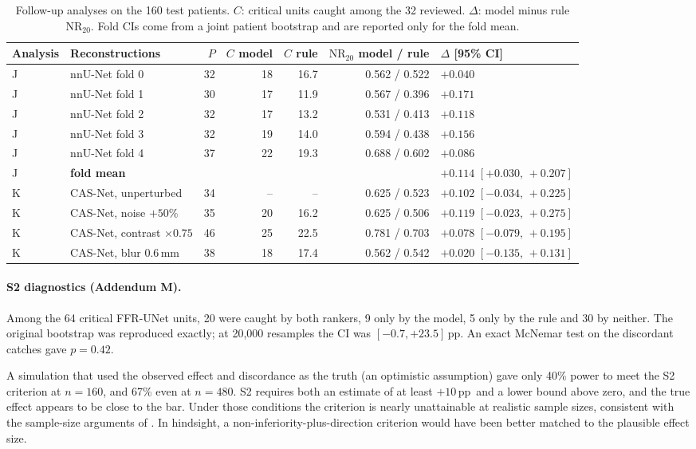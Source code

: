 \documentclass[11pt]{article}
\newcommand{\NR}{\mathrm{NR}_{20}}
\newcommand{\pp}{\,pp}
\begin{document}
\begin{table}[t]
\centering
\small
\caption{Follow-up analyses on the 160 test patients. $C$: critical units caught among the 32 reviewed. $\Delta$: model minus rule $\NR$. Fold CIs come from a joint patient bootstrap and are reported only for the fold mean.}
\label{tab:follow}
\setlength{\tabcolsep}{4pt}
\begin{tabular}{llrrrrl}
\toprule
Analysis & Reconstructions & $P$ & $C$ model & $C$ rule & $\NR$ model / rule & $\Delta$ [95\% CI] \\
\midrule
J & nnU-Net fold 0 & 32 & 18 & 16.7 & 0.562 / 0.522 & $+0.040$ \\
J & nnU-Net fold 1 & 30 & 17 & 11.9 & 0.567 / 0.396 & $+0.171$ \\
J & nnU-Net fold 2 & 32 & 17 & 13.2 & 0.531 / 0.413 & $+0.118$ \\
J & nnU-Net fold 3 & 32 & 19 & 14.0 & 0.594 / 0.438 & $+0.156$ \\
J & nnU-Net fold 4 & 37 & 22 & 19.3 & 0.688 / 0.602 & $+0.086$ \\
J & \textbf{fold mean} & & & & & $\mathbf{+0.114}$ $[+0.030,\,+0.207]$ \\
\midrule
K & CAS-Net, unperturbed & 34 & -- & -- & 0.625 / 0.523 & $+0.102$ $[-0.034,\,+0.225]$ \\
K & CAS-Net, noise $+50\%$ & 35 & 20 & 16.2 & 0.625 / 0.506 & $+0.119$ $[-0.023,\,+0.275]$ \\
K & CAS-Net, contrast $\times 0.75$ & 46 & 25 & 22.5 & 0.781 / 0.703 & $+0.078$ $[-0.079,\,+0.195]$ \\
K & CAS-Net, blur 0.6\,mm & 38 & 18 & 17.4 & 0.562 / 0.542 & $+0.020$ $[-0.135,\,+0.131]$ \\
\bottomrule
\end{tabular}
\end{table}

\paragraph{S2 diagnostics (Addendum M).} Among the 64 critical FFR-UNet units, 20 were caught by both rankers, 9 only by the model, 5 only by the rule and 30 by neither. The original bootstrap was reproduced exactly; at 20{,}000 resamples the CI was $[-0.7, +23.5]$\pp. An exact McNemar test \citep{mcnemar1947} on the discordant catches gave $p = 0.42$.

A simulation that used the observed effect and discordance as the truth (an optimistic assumption) gave only 40\% power to meet the S2 criterion at $n=160$, and 67\% even at $n = 480$. S2 requires both an estimate of at least $+10$\pp\ and a lower bound above zero, and the true effect appears to be close to the bar. Under those conditions the criterion is nearly unattainable at realistic sample sizes, consistent with the sample-size arguments of \citet{gibson2017power}. In hindsight, a non-inferiority-plus-direction criterion would have been better matched to the plausible effect size.
\end{document}
